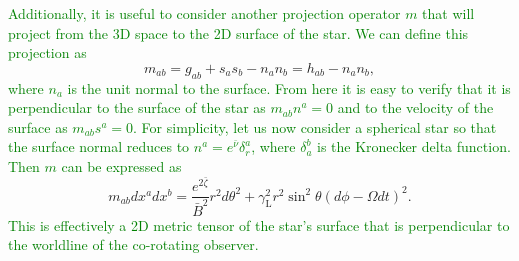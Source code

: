 \documentclass{aa}
\newcommand{\be}{\begin{equation}}
\newcommand{\ee}{\end{equation}}
\newcommand{\red}[1]{\textcolor{red}{#1}}
\newcommand{\refe}[1]{\textcolor{green}{{#1}}}
\newcommand{\refedel}[1]{}
\newcommand{\nub}{\ensuremath{\bar{\nu}}}
\newcommand{\zetab}{\ensuremath{\bar{\zeta}}}
\newcommand{\Bb}{\ensuremath{\bar{B}}}
\newcommand{\lgamma}{\gamma_{\text{L}}}
\begin{document}
\refe{Additionally, it is useful to consider another projection operator $m$ that will project from the 3D space to the 2D surface of the star.}
\refe{We can define this projection as}
\be\label{eq:2dmetric}
m_{ab} = g_{ab} + s_a s_b - n_a n_b = h_{ab} - n_a n_b,
\ee
\refe{where $n_a$ is the unit normal to the surface.}
\refe{From here it is easy to verify that it is perpendicular to the surface of the star as $m_{ab} n^a = 0$ and to the velocity of the surface as $m_{ab} s^a = 0$.}
\refe{For simplicity, let us now consider a spherical star so that the surface normal reduces to $n^a = e^{\nub} \delta_r^a$, where $\delta_a^b$ is the Kronecker delta function.}
\refe{Then $m$ can be expressed as}
\be
m_{ab} dx^a dx^b = \frac{e^{2\zetab}}{\Bb^2} r^2 d\theta^2 + \lgamma^2 r^2 \sin^2\theta (d\phi - \Omega dt)^2.
\ee
\refe{This is effectively a 2D metric tensor of the star's surface that is perpendicular to the worldline of the co-rotating observer.}
\end{document}
